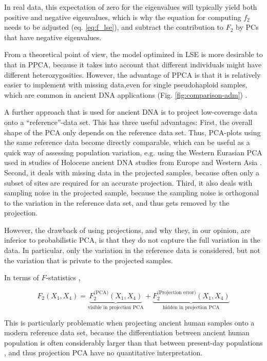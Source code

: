 \documentclass[12pt]{article}
\begin{document}
In real data, this expectation of zero for the eigenvalues will typically yield both positive and negative eigenvalues, which is why the equation for computing $f_2$ needs to be adjusted (eq. \ref{eq:f_lse}), and subtract the contribution to $F_2$ by PCs that have negative eigenvalues.

From a theoretical point of view, the model optimized in LSE is more desirable to that in PPCA, because it takes into account that different individuals might have different heterozygosities. However, the advantage of PPCA is that it is relatively easier to implement with missing data,even for single pseudohaploid samples, which are common in ancient DNA applications (Fig. \ref{fig:comparison-adm}) \citep{tipping_probabilistic_1999-1, orlando_ancient_2021}. 


A further approach that is used for ancient DNA is to project low-coverage data onto a ``reference''-data set. This has three useful advantages: First, the overall shape of the PCA only depends on the reference data set. Thus, PCA-plots using the same reference data become directly comparable, which can be useful as a quick way of assessing population variation, e.g. using the Western Eurasian PCA used in studies of Holocene ancient DNA studies from Europe and Western Asia \citep{haak_massive_2015}. Second, it deals with missing data in the projected samples, because often only a subset of sites are required for an accurate projection. Third, it also deals with sampling noise in the projected sample, because the sampling noise is orthogonal to the variation in the reference data set, and thus gets removed by the projection.

However, the drawback of using projections, and why they, in our opinion, are inferior to probabilistic PCA, is that they do not capture the full variation in the data. In particular, only the variation in the reference data is considered, but not the variation that is private to the projected samples. 

In terms of $F$-statistics \citep{peter_geometric_2022}, 

\begin{equation*}
    F_2(X_1, X_4) = \underbrace{F_2^{\text{(PCA)}}(X_1, X_4)}_{\text{visible in projection PCA}} + \underbrace{F_2^{\text{(Projection error)}}(X_1, X_4)}_{\text{hidden in projection PCA}}
\end{equation*}

This is particularly problematic when projecting ancient human samples onto a modern reference data set, because the differentiation between ancient human population is often considerably larger than that between present-day populations \citep{haak_massive_2015, lazaridis_ancient_2014}, and thus projection PCA have no quantitative interpretation.
\end{document}
